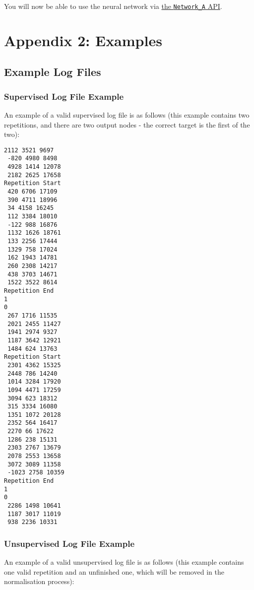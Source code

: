 \documentclass[a4paper]{article}
\begin{document}
You will now be able to use the neural network via \hyperref[subsec:dn_API_networka]{the \lstinline{Network_A} API}.

\section{Appendix 2: Examples}
\label{sec:a2}

\subsection{Example Log Files}%
\label{subsec:a2_lf}

\subsubsection{Supervised Log File Example}
\label{subsubsec:a2_lf_supervised}

An example of a valid supervised log file is as follows (this example contains two repetitions, and there are two output nodes - the correct target is the first of the two):

\begin{lstlisting}
2112 3521 9697
 -820 4980 8498
 4928 1414 12078
 2182 2625 17658
Repetition Start
 420 6706 17109
 390 4711 18996
 34 4158 16245
 112 3384 18010
 -122 988 16876
 1132 1626 18761
 133 2256 17444
 1329 758 17024
 162 1943 14781
 260 2308 14217
 438 3703 14671
 1522 3522 8614
Repetition End
1
0
 267 1716 11535
 2021 2455 11427
 1941 2974 9327
 1187 3642 12921
 1484 624 13763
Repetition Start
 2301 4362 15325
 2448 786 14240
 1014 3284 17920
 1094 4471 17259
 3094 623 18312
 315 3334 16080
 1351 1072 20128
 2352 564 16417
 2270 66 17622
 1286 238 15131
 2303 2767 13679
 2078 2553 13658
 3072 3089 11358
 -1023 2758 10359
Repetition End
1
0
 2286 1498 10641
 1187 3017 11019
 938 2236 10331
\end{lstlisting}

\subsubsection{Unsupervised Log File Example}
\label{subsubsec:a2_lf_unsupervised}

An example of a valid unsupervised log file is as follows (this example contains one valid repetition and an unfinished one, which will be removed in the normalisation process):
\end{document}
